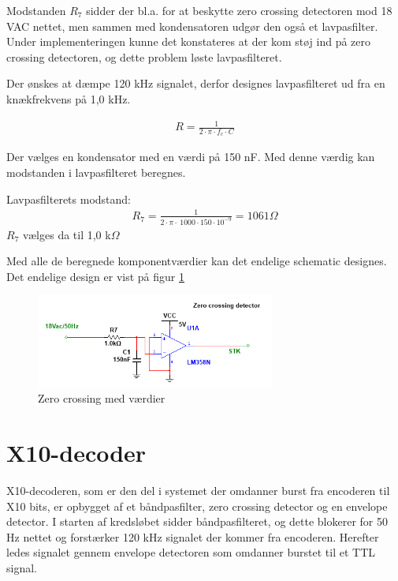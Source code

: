 Modstanden $R_7$ sidder der bl.a. for at beskytte zero crossing detectoren mod 18 VAC nettet, men sammen med kondensatoren udgør den også et lavpasfilter. Under implementeringen kunne det konstateres at der kom støj ind på zero crossing detectoren, og dette problem løste lavpasfilteret. 

Der ønskes at dæmpe 120 kHz signalet, derfor designes lavpasfilteret ud fra en knækfrekvens på 1,0 kHz. 

\begin{align}
R = \frac{1}{2 \cdot \pi \cdot f_c \cdot C } 
\end{align}

Der vælges en kondensator med en værdi på 150 nF. Med denne værdig kan modstanden i lavpasfilteret beregnes. 

Lavpasfilterets modstand:
\begin{align}
R_7 = \frac{1}{2 \cdot \pi \cdot \ 1000 \cdot 150 \cdot 10^{-9}} = 1061 \Omega
\end{align}
$R_7$ vælges da til 1,0 k$\Omega$

Med alle de beregnede komponentværdier kan det endelige schematic designes. Det endelige design er vist på figur \ref{fig:ZC_MV} 

\begin{figure}[htbp]
	\centering
	\includegraphics[width=0.70\textwidth]{billeder/HWdesign/ZC_MV}
	\caption{Zero crossing med værdier}
	\label{fig:ZC_MV}
\end{figure}

\newpage

\section{X10-decoder}
X10-decoderen, som er den del i systemet der omdanner burst fra encoderen til X10 bits, er opbygget af et båndpasfilter, zero crossing detector og en envelope detector. I starten af kredsløbet sidder båndpasfilteret, og dette blokerer for 50 Hz nettet og forstærker 120 kHz signalet der kommer fra encoderen. Herefter ledes signalet gennem envelope detectoren som omdanner burstet til et TTL signal.


